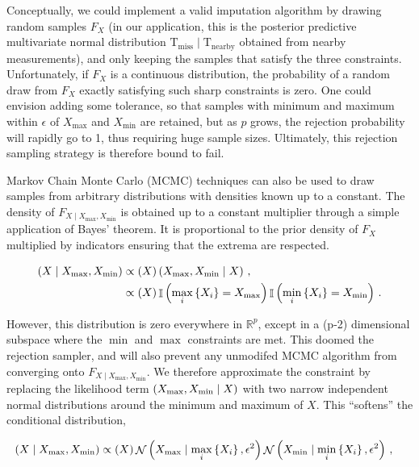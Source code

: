 \documentclass[letter]{article}
\newcommand{\genericdel}[3]{%
      \left#1#3\right#2
    }
\newcommand{\del}[1]{\genericdel(){#1}}
\newcommand{\cbr}[1]{\genericdel\{\}{#1}}
\let\Pr\relax
\DeclareMathOperator{\Pr}{\mathbb{P}}
\DeclareMathOperator{\Ind}{\mathbb{I}}
\DeclareMathOperator{\normal}{\mathcal{N}}
\newcommand{\T}{\mathrm{T}}
\newcommand{\miss}{\mathrm{miss}}
\newcommand{\obs}{\mathrm{nearby}}
\newcommand{\Xmax}{X_{\max}}
\newcommand{\Xmin}{X_{\min}}
\newcommand{\Fcond}{F_{X \mid \Xmax,\Xmin}}
\newcommand{\eqlabel}[1]{\label{#1}}
\begin{document}
        Conceptually, we could implement a valid imputation algorithm by drawing random samples \(F_X\)
(in our application, this is the posterior predictive multivariate normal distribution \(\T_\miss \mid \T_\obs\) obtained from nearby measurements),
and only keeping the samples that satisfy the three constraints.
Unfortunately, if \(F_X\) is a continuous distribution, the probability of a random draw from \(F_X\) exactly satisfying such sharp constraints is zero.
One could envision adding some tolerance, so that samples with minimum and maximum within \(\epsilon\) of \(\Xmax\) and \(\Xmin\) are retained, but as \(p\) grows, the rejection probability will rapidly go to 1, thus requiring huge sample sizes.
Ultimately, this rejection sampling strategy is therefore bound to fail.
    


        Markov Chain Monte Carlo (MCMC) techniques can also be used to draw samples from arbitrary distributions with densities known up to a constant. The density of \(\Fcond\) is obtained up to a constant multiplier through a simple application of Bayes' theorem. It is proportional to the prior density of \(F_X\) multiplied by indicators ensuring that the extrema are respected.

\begin{equation}\begin{split}
    \Pr\del{X \mid \Xmax,\Xmin} &\propto \Pr\del{X} \Pr\del{\Xmax,\Xmin \mid X} \,, \\
           &\propto \Pr\del{X} \Ind\del{ \max_i\cbr{X_i} = \Xmax }\Ind\del{ \min_i\cbr{X_i} = \Xmin } \,.
\end{split}\end{equation}

However, this distribution is zero everywhere in \(\mathbb{R}^p\), except in a (p-2) dimensional subspace where the \(\min\) and \(\max\) constraints are met.
This doomed the rejection sampler, and will also prevent any unmodifed MCMC algorithm from converging onto \(\Fcond\).
We therefore approximate the constraint by replacing the likelihood term \(\Pr\del{\Xmax,\Xmin \mid X}\) with two narrow independent normal distributions around the minimum and maximum of \(X\).
This ``softens'' the conditional distribution,

\begin{equation}
\eqlabel{eq:normal_lik}
\begin{split}
    \Pr\del{X \mid \Xmax,\Xmin} &\propto \Pr\del{X} 
                                         \normal\del{\Xmax \mid \max_i\cbr{X_i}, \epsilon^2}
                                         \normal\del{\Xmin \mid \min_i\cbr{X_i}, \epsilon^2}\,,
\end{split}\end{equation}
\end{document}
